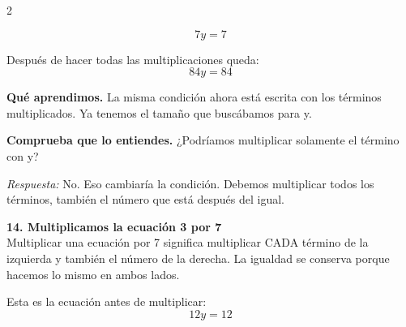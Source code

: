 \documentclass[11pt,a4paper,landscape]{article}
\begin{document}
\begin{multicols*}{2}
\begin{minipage}{\linewidth}
\[7y = 7\]
\par{}\par\smallskip
\par\smallskip Después de hacer todas las multiplicaciones queda:
\[84y = 84\]
\par\smallskip\textbf{Qué aprendimos.} La misma condición ahora está escrita con los términos multiplicados. Ya tenemos el tamaño que buscábamos para y.
\par\smallskip\textbf{Comprueba que lo entiendes.} ¿Podríamos multiplicar solamente el término con y?\par\textit{Respuesta:} No. Eso cambiaría la condición. Debemos multiplicar todos los términos, también el número que está después del igual.
\end{minipage}\par\medskip
\noindent\begin{minipage}{\linewidth}\textbf{14. Multiplicamos la ecuación 3 por 7}\\[2pt]Multiplicar una ecuación por 7 significa multiplicar CADA término de la izquierda y también el número de la derecha. La igualdad se conserva porque hacemos lo mismo en ambos lados.
\par\smallskip Esta es la ecuación antes de multiplicar:
\[12y = 12\]
\par{}\par\smallskip

\end{minipage}
\end{multicols*}
\end{document}
